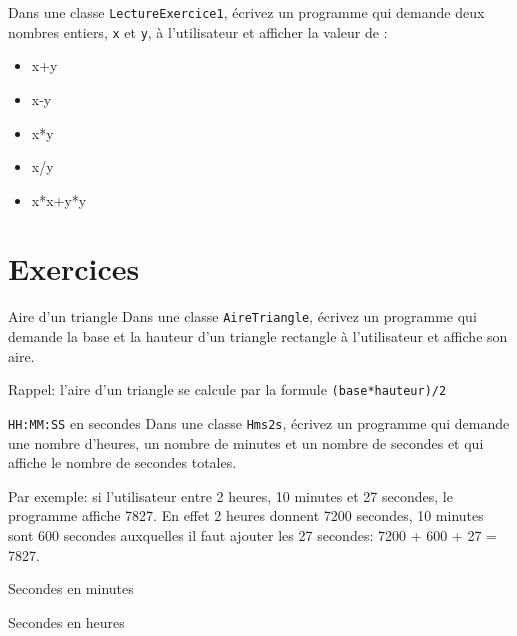 \documentclass[a4paper,11pt]{article}
\begin{document}
	\begin{Exercice}{} 
		Dans une classe \texttt{LectureExercice1}, écrivez un programme qui demande 
		deux nombres entiers, \texttt{x} et \texttt{y}, à l'utilisateur et afficher la valeur de :
		\begin{itemize}
		 	\item x+y
			\item x-y
			\item x*y
			\item x/y
			\item x*x+y*y
		\end{itemize} 
	\end{Exercice}


\section{Exercices}

	\begin{Exercice}{Aire d'un triangle }
		Dans une classe \texttt{AireTriangle}, écrivez un programme qui demande 
		la base et la hauteur d'un triangle rectangle à l'utilisateur et affiche son aire.
		
		Rappel: l'aire d'un triangle se calcule par la formule \texttt{(base*hauteur)/2}
		
	\end{Exercice}
	
	\begin{Exercice}{\texttt{HH:MM:SS} en secondes} 
		Dans une classe \texttt{Hms2s}, écrivez un programme qui demande 
		une nombre d'heures, un nombre de minutes et un nombre de secondes
		et qui affiche le nombre de secondes totales.
		
		Par exemple: si l'utilisateur entre 2 heures, 10 minutes et 27 secondes, le programme affiche
		7827. En effet 2 heures donnent 7200 secondes, 10 minutes sont 600 secondes 
		auxquelles il faut ajouter les 27 secondes: 7200 + 600 + 27 = 7827. 
	\end{Exercice}

	\begin{Exercice}{Secondes en minutes} 
	\end{Exercice}

	\begin{Exercice}{Secondes en heures} 
	\end{Exercice}
\end{document}

